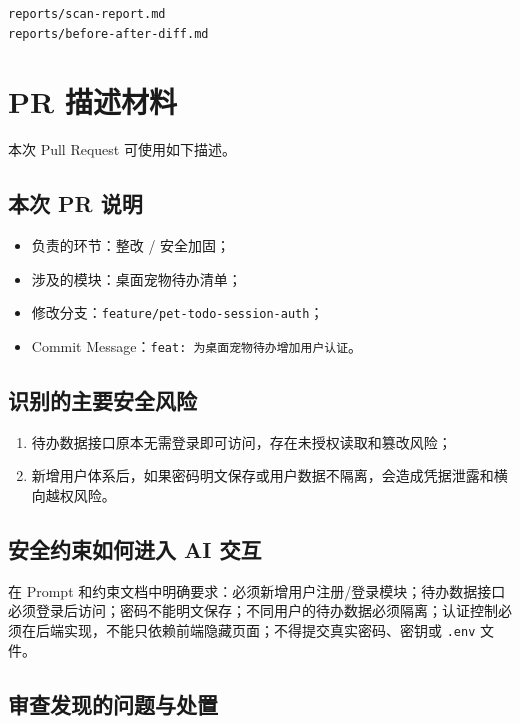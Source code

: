 \documentclass[12pt,a4paper]{ctexart}
\begin{document}
\begin{verbatim}
reports/scan-report.md
reports/before-after-diff.md
\end{verbatim}

\section{PR 描述材料}

本次 Pull Request 可使用如下描述。

\subsection*{本次 PR 说明}

\begin{itemize}[leftmargin=2.5em]
    \item 负责的环节：整改 / 安全加固；
    \item 涉及的模块：桌面宠物待办清单；
    \item 修改分支：\texttt{feature/pet-todo-session-auth}；
    \item Commit Message：\texttt{feat: 为桌面宠物待办增加用户认证}。
\end{itemize}

\subsection*{识别的主要安全风险}

\begin{enumerate}[leftmargin=2.5em]
    \item 待办数据接口原本无需登录即可访问，存在未授权读取和篡改风险；
    \item 新增用户体系后，如果密码明文保存或用户数据不隔离，会造成凭据泄露和横向越权风险。
\end{enumerate}

\subsection*{安全约束如何进入 AI 交互}

在 Prompt 和约束文档中明确要求：必须新增用户注册/登录模块；待办数据接口必须登录后访问；密码不能明文保存；不同用户的待办数据必须隔离；认证控制必须在后端实现，不能只依赖前端隐藏页面；不得提交真实密码、密钥或 \texttt{.env} 文件。

\subsection*{审查发现的问题与处置}
\end{document}
